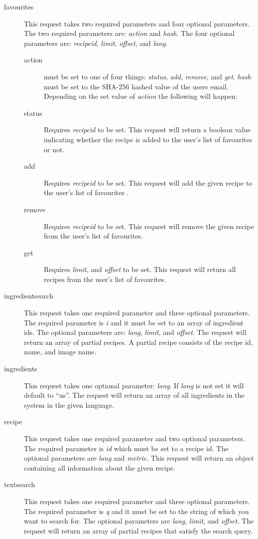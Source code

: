 \begin{description}
\item[favourites] This request takes two required parameters and four optional parameters. The two required parameters are: \textit{action} and \textit{hash}. The four optional parameters are: \textit{recipeid}, \textit{limit}, \textit{offset}, and \textit{lang}.

\begin{description}
\item[action] must be set to one of four things: \textit{status}, \textit{add}, \textit{remove}, and \textit{get}. \textit{hash} must be set to the SHA-256 hashed value of the users email.
Depending on the set value of \textit{action} the following will happen:
\item[status] Requires \textit{recipeid} to be set. This request will return a boolean value indicating whether the recipe is added to the user's list of favourites or not.
\item[add] Requires \textit{recipeid} to be set. This request will add the given recipe to the user's list of favourites .
\item[remove] Requires \textit{recipeid} to be set. This request will remove the given recipe from the user's list of favourites.
\item[get] Requires \textit{limit}, and \textit{offset} to be set. This request will return all recipes from the user's list of favourites.
\end{description}

\item[ingredientsearch] This request takes one required parameter and three optional parameters. The required parameter is \textit{i} and it must be set to an array of ingredient ids. The optional parameters are: \textit{lang}, \textit{limit}, and \textit{offset}. The request will return an array of partial recipes. A partial recipe consists of the recipe id, name, and image name.
\item[ingredients] This request takes one optional parameter: \textit{lang}. If \textit{lang} is not set it will default to ``us''. The request will return an array of all ingredients in the system in the given language.
\item[recipe] This request takes one required parameter and two optional parameters. The required parameter is \textit{id} which must be set to a recipe id. The optional parameters are \textit{lang} and \textit{metric}. This request will return an object containing all information about the given recipe.
\item[textsearch] This request takes one required parameter and three optional parameters. The required parameter is \textit{q} and it must be set to the string of which you want to search for. The optional parameters are \textit{lang}, \textit{limit}, and \textit{offset}. The request will return an array of partial recipes that satisfy the search query.
\end{description}



